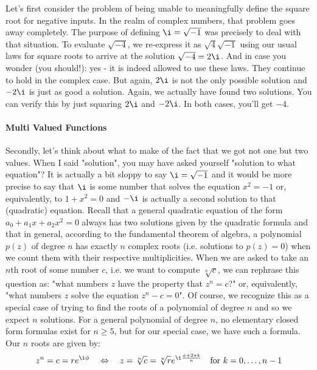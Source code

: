 \medskip
Let's first consider the problem of being unable to meaningfully define the square root for negative inputs. In the realm of complex numbers, that problem goes away completely. The purpose of defining $\i = \sqrt{-1}$ was precisely to deal with that situation. To evaluate $\sqrt{-4}$, we re-express it as $\sqrt{4} \sqrt{-1}$ using our usual laws for square roots to arrive at the solution $\sqrt{-4} = 2 \i$. And in case you wonder (you should!): yes - it is indeed allowed to use these laws. They continue to hold in the complex case. But again, $2 \i$ is not the only possible solution and $-2 \i$ is just as good a solution. Again, we actually have found two solutions. You can verify this by just squaring $2 \i$ and $-2 \i$. In both cases, you'll get $-4$.

\paragraph{Multi Valued Functions}
Secondly, let's think about what to make of the fact that we got not one but two values. When I said "solution", you may have asked yourself "solution to what equation"? It is actually a bit sloppy to say $\i = \sqrt{-1}$ and it would be more precise to say that $\i$ is some number that solves the equation $x^2 = -1$ or, equivalently, to  $1 + x^2 = 0$ and $-\i$ is actually a second solution to that (quadratic) equation. Recall that a general quadratic equation of the form $a_0 + a_1 x + a_2 x^2 = 0$  always has two solutions given by the quadratic formula and that in general, according to the fundamental theorem of algebra, a polynomial $p(z)$ of degree $n$ has exactly $n$ complex roots (i.e. solutions to $p(z) = 0$) when we count them with their respective multiplicities. When we are asked to take an $n$th root of some number $c$, i.e. we want to compute $\sqrt[n]{c}$, we can rephrase this question as: "what numbers $z$ have the property that $z^n = c$?" or, equivalently, "what numbers $z$ solve the equation $z^n - c = 0$". Of course, we recognize this as a special case of trying to find the roots of a polynomial of degree $n$ and so we expect $n$ solutions. For a general polynomial of degree $n$, no elementary closed form formulas exist for $n \geq 5$, but for our special case, we have such a formula. Our $n$ roots are given by:
\begin{equation}
 z^n = c = r e^{\i \phi} \quad \Leftrightarrow \quad
 z = \sqrt[n]{c} = \sqrt[n]{r} e^{\i \frac{\phi + 2 \pi k}{n}} \quad \text{for } k = 0,\ldots,n-1
\end{equation}
